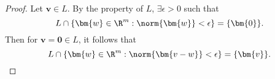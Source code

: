 \documentclass[
  coursecode={MTHE 418},
  assignmentname={Homework \homeworknumber},
  studentnumber=20053722,
  name={Bryan Hoang},
  draft,
]{
  ltxanswer%
}
\begin{document}
  \begin{questions}
    \setcounter{question}{\questionnumber}
    \addtocounter{question}{-1}
    \question[10]
    \begin{solution}
      \begin{proof}
        Let \(\bm{v} \in L\). By the property of \(L\), \(\exists \epsilon > 0\) such that
        \begin{equation*}
          L \cap \{\bm{w} \in \R^{m} : \norm{\bm{w}} < \epsilon\} = \{\bm{0}\}.
        \end{equation*}
        Then for \(\bm{v} = \bm{0} \in L\), it follows that
        \begin{equation*}
          L \cap \{\bm{w} \in \R^{m} : \norm{\bm{v - w}} < \epsilon\} = \{\bm{v}\}.
        \end{equation*}
      \end{proof}
    \end{solution}
  \end{questions}
\end{document}
